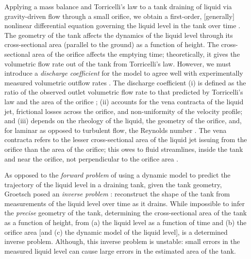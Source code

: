 \documentclass[openacc]{rsproca_new}%
\begin{document}
Applying a mass balance and Torricelli's law to a tank draining of liquid via gravity-driven flow through a small orifice, we obtain a first-order, [generally] nonlinear differential equation governing the liquid level in the tank over time \cite{groetsch1993inverse,seborg2016process,debook}.
The geometry of the tank affects the dynamics of the liquid level through its cross-sectional area (parallel to the ground) as a function of height.
The cross-sectional area of the orifice affects the emptying time; theoretically, it gives the volumetric flow rate out of the tank from Torricelli's law. 
However, we must introduce a \emph{discharge coefficient} \cite{de2000pin,blasone2015discharge,wadhwa2021study,liu2008drainage} for the model to agree well with experimentally measured volumetric outflow rates \cite{farmer1992physical,driver1998torricelli,brady2009siphons,rother2024modelling,paldy1963apparatus,ivanov2014testing,williams2021vessel,pavesi2019investigating,planinvsivc2011holes,saleta2005experimental,lopac2015water,powell2012carrying}.
The discharge coefficient
(i) is defined as the ratio of the observed outlet volumetric flow rate to that predicted by Torricelli's law and the area of the orifice \cite{hicks2014determining};
(ii) accounts for the vena contracta of the liquid jet, frictional losses across the orifice, and non-uniformity of the velocity profile; and
(iii) depends on the rheology of the liquid, the geometry of the orifice, and, for laminar as opposed to turbulent flow, the Reynolds number \cite{teoman2022discharge}. 
The vena contracta refers to the lesser cross-sectional area of the liquid jet issuing from the orifice than the area of the orifice; this owes to fluid streamlines, inside the tank and near the orifice, not perpendicular to the orifice area \cite{horsch2020simple}. 
\cite{teoman2022discharge,hicks2014determining,blasone2015discharge,lienhard1984velocity,wadhwa2021study}

As opposed to the \emph{forward problem} of using a dynamic model to predict the trajectory of the liquid level in a draining tank, given the tank geometry, Groetsch \cite{groetsch1993inverse,groetsch1999inverse} posed an \emph{inverse problem} \cite{groetsch1993inverse,neto2012introduction,tarantola2005inverse}: reconstruct the shape of the tank from measurements of the liquid level over time as it drains. 
While impossible to infer the \emph{precise} geometry of the tank, determining the cross-sectional area of the tank as a function of height, from (a) the liquid level as a function of time and (b) the orifice area [and (c) the dynamic model of the liquid level], is a determined inverse problem. Although, this inverse problem is unstable: small errors in the measured liquid level can cause large errors in the estimated area of the tank. \cite{groetsch1993inverse}
\end{document}
